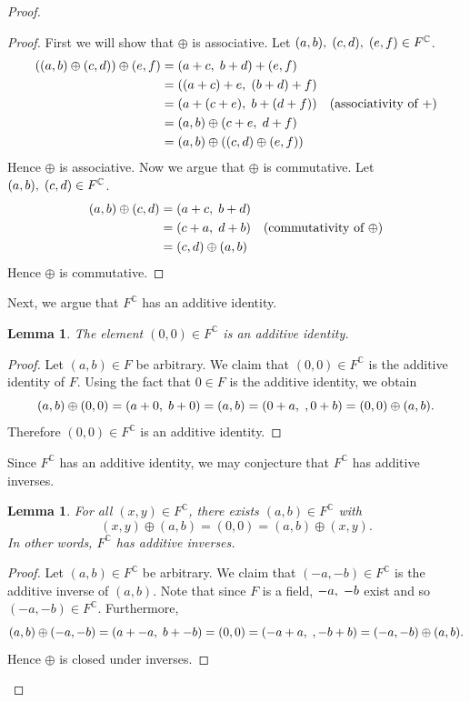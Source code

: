 \documentclass[12pt]{article}
\newcommand{\C}{\mathbb{C}}
\newcommand{\ttc}{, \hspace{1mm}}
\theoremstyle{plain}
\newtheorem{lemma}[theorem]{Lemma}
\theoremstyle{definition}
\begin{document}
\begin{appendices}
\begin{proof}
\begin{proof}
First we will show that $\oplus$ is associative. Let $(a,b)\ttc(c,d)\ttc(e,f)\in F^\C$.
\begin{align*}
	((a,b)\oplus(c,d))\oplus(e,f) & = (a + c\ttc b + d) + (e,f)\\
	& = ((a + c) + e\ttc (b + d) + f)\\
	& = (a + (c + e)\ttc b + (d + f)) & \text{(associativity of $+$)}\\
	& = (a,b) \oplus (c + e\ttc d + f)\\
	& = (a,b)\oplus ((c,d) \oplus (e,f))
\end{align*}
Hence $\oplus$ is associative. Now we argue that $\oplus$ is commutative. Let $(a,b)\ttc(c,d)\in F^\C$.
\begin{align*}
	(a,b)\oplus (c,d) & = (a + c\ttc b + d)\\
	& = (c + a\ttc d + b) & \text{(commutativity of $\oplus$)}\\
	& = (c,d)\oplus (a,b)
\end{align*}
Hence $\oplus$ is commutative. 
\end{proof}

Next, we argue that $F^\C$ has an additive identity.\\

\begin{lemma}
	The element $(0,0)\in F^\C$ is an additive identity.
\end{lemma}

\begin{proof}
Let $(a,b)\in F$ be arbitrary. We claim that $(0,0)\in F^\C$ is the additive identity of $F$. Using the fact that $0\in F$ is the additive identity, we obtain
	\[
		(a,b)\oplus (0,0) = (a + 0\ttc b + 0) = (a,b) = (0 + a\ttc, 0 + b) = (0,0) \oplus (a,b).
	\]
Therefore $(0,0)\in F^\C$ is an additive identity.
\end{proof} 

Since $F^\C$ has an additive identity, we may conjecture that $F^\C$ has additive inverses. 

\begin{lemma}
	For all $(x,y)\in F^\C$, there exists $(a,b)\in F^\C$ with 
	\[	
		(x,y)\oplus (a,b) = (0,0) = (a,b)\oplus (x,y).
	\]
	In other words, $F^\C$ has additive inverses.
\end{lemma}

\begin{proof}
Let $(a,b)\in F^\C$ be arbitrary. We claim that $(-a,-b)\in F^\C$ is the additive inverse of $(a,b)$. Note that since $F$ is a field, $-a\ttc -b$ exist and so $(-a,-b)\in F^\C$. Furthermore,
	\[
		(a,b)\oplus (-a,-b) = (a + -a\ttc b + -b) = (0,0) = (-a + a\ttc, -b + b) = (-a,-b) \oplus (a,b).
	\]
	Hence $\oplus$ is closed under inverses.
\end{proof}


\end{proof}
\end{appendices}
\end{document}
